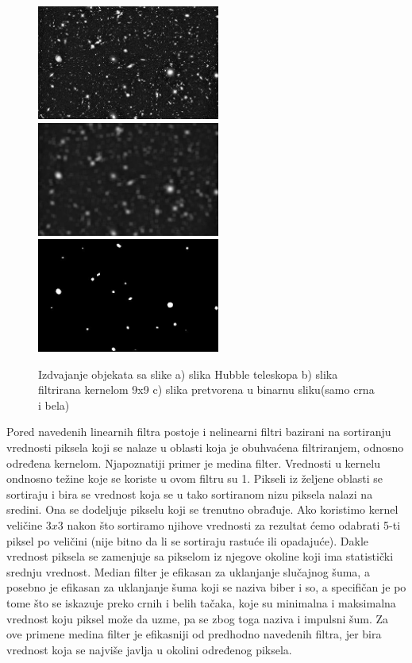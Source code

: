 \documentclass[a4paper,12pt,titlepage]{article}
\begin{document}
\begin{figure}[ht!]
\centering
\includegraphics[width=60mm]{img/tel.jpg}
\includegraphics[width=60mm]{img/telAvg.jpg}
\includegraphics[width=60mm]{img/telTh.jpg}
\caption{Izdvajanje objekata sa slike a) slika Hubble teleskopa b) slika filtrirana kernelom 9x9 c) slika pretvorena u binarnu sliku(samo crna i bela)}
\label{overflow}
\end{figure}

Pored navedenih linearnih filtra postoje i nelinearni filtri bazirani na sortiranju vrednosti piksela koji se nalaze u oblasti koja je obuhvaćena filtriranjem, odnosno određena kernelom. Njapoznatiji primer je medina filter. Vrednosti u kernelu ondnosno težine koje se koriste u ovom filtru su 1. Pikseli iz željene oblasti se sortiraju i bira se vrednost koja se u tako sortiranom nizu piksela nalazi na sredini. Ona se dodeljuje pikselu koji se trenutno obrađuje. Ako koristimo kernel veličine $3 x 3$ nakon što sortiramo njihove vrednosti za rezultat ćemo odabrati 5-ti piksel po veličini (nije bitno da li se sortiraju rastuće ili opadajuće). Dakle vrednost piksela se zamenjuje sa pikselom iz njegove okoline koji ima statistički srednju vrednost. Median filter je efikasan za uklanjanje slučajnog šuma, a posebno je efikasan za uklanjanje šuma koji se naziva biber i so, a specifičan je po tome što se iskazuje preko crnih i belih tačaka, koje su minimalna i maksimalna vrednost koju piksel može da uzme, pa se zbog toga naziva i impulsni šum. Za ove primene medina filter je efikasniji od predhodno navedenih filtra, jer bira vrednost koja se najviše javlja u okolini određenog piksela.
\end{document}
